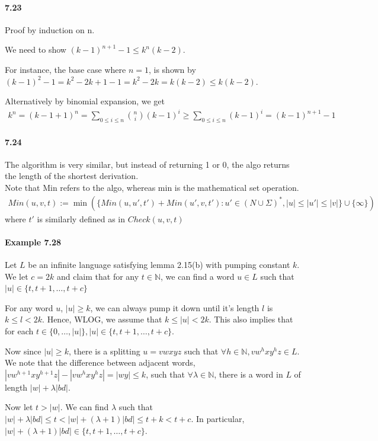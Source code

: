 \documentclass{article}
\begin{document}
\paragraph{7.23} Proof by induction on n.

We need to show $(k-1)^{n+1} - 1\leq k^n(k-2)$.

For instance, the base case where $n = 1$, is shown by $(k-1)^2 - 1 = k^2 - 2k +1 - 1 = k^2 - 2k = k(k-2)\leq k(k-2)$.

Alternatively by binomial expansion, we get
\begin{align*}
	k^n = (k-1 + 1)^n = \sum_{0\leq i\leq n}\binom{n}{i} (k-1)^i \geq \sum_{0\leq i\leq n}(k-1)^i = (k-1)^{n+1} - 1
\end{align*}

\paragraph{7.24}
The algorithm is very similar, but instead of returning 1 or 0, the algo returns the length of the shortest derivation.\\
Note that Min refers to the algo, whereas min is the mathematical set operation.
\begin{align*}
	Min(u,v,t) := \min(\{Min(u,u',t') + Min(u',v,t') : u'\in (N\cup \Sigma)^*, |u|\leq |u'|\leq |v| \}\cup \{\infty \})
\end{align*}
where $t'$ is similarly defined as in $Check(u,v,t)$

\paragraph{Example 7.28} Let $L$ be an infinite language satisfying lemma 2.15(b) with pumping constant $k$. We let $c=2k$ and claim that for any $t\in \mathbb{N}$, we can find a word $u\in L$ such that $|u|\in \{t, t+1, \dots, t+c\}$

For any word $u$, $|u|\geq k$, we can always pump it down until it's length $l$ is $k\leq l< 2k$. Hence, WLOG, we assume that $k\leq |u|<2k$. This also implies that for each $t\in \{0, \dots, |u|\}, |u| \in \{t, t+1, \dots, t+c\}$.

Now since $|u|\geq k$, there is a splitting $u=vwxyz$ such that $\forall h\in \mathbb{N}, vw^hxy^hz\in L$. We note that the difference between adjacent words, $|vw^{h+1}xy^{h+1}z| - |vw^hxy^hz|=|wy|\leq k$, such that $\forall \lambda \in \mathbb{N}$, there is a word in $L$ of length $|w|+\lambda |bd|$.

Now let $t>|w|$. We can find $\lambda$ such that $|w|+\lambda |bd|\leq t<|w|+(\lambda + 1)|bd|\leq t+k < t+c$. In particular, $|w|+(\lambda + 1)|bd|\in \{t, t+1, \dots, t+c\}$.
\end{document}
